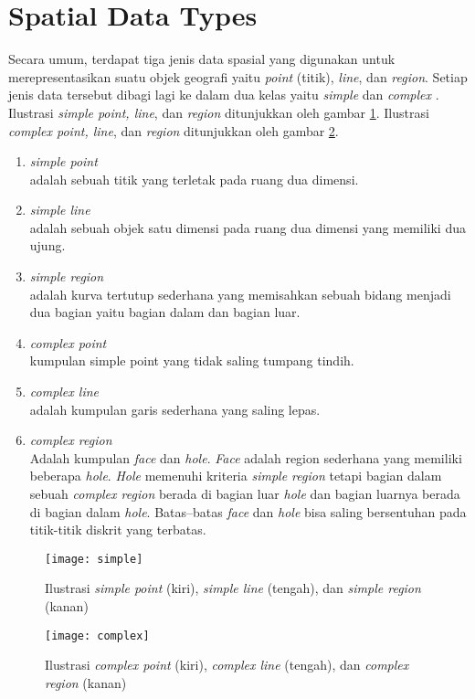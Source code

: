 \section{Spatial Data Types}
Secara umum, terdapat tiga jenis data spasial yang digunakan untuk merepresentasikan suatu objek geografi yaitu \textit{point} (titik), \textit{line}, dan \textit{region}. Setiap jenis data tersebut dibagi lagi ke dalam dua kelas yaitu \textit{simple} dan \textit{complex} \cite{advdb:15}. Ilustrasi \textit{simple point, line}, dan \textit{region} ditunjukkan oleh gambar \ref{fig:simple}. Ilustrasi \textit{complex point, line}, dan \textit{region} ditunjukkan oleh gambar \ref{fig:complex}.
\begin{enumerate}
\item \textit{simple point}\\
adalah sebuah titik yang terletak pada ruang dua dimensi.

\item \textit{simple line}\\
adalah sebuah objek satu dimensi pada ruang dua dimensi yang memiliki dua ujung.

\item \textit{simple region}\\
adalah kurva tertutup sederhana yang memisahkan sebuah bidang menjadi dua bagian yaitu bagian dalam dan bagian luar.

\item \textit{complex point}\\
kumpulan simple point yang tidak saling tumpang tindih.

\item \textit{complex line}\\
adalah kumpulan garis sederhana yang saling lepas.

\item \textit{complex region}\\
Adalah kumpulan \textit{face} dan  \textit{hole}. \textit{Face} adalah region sederhana yang memiliki beberapa \textit{hole}. \textit{Hole} memenuhi kriteria \textit{simple region} tetapi bagian dalam sebuah \textit{complex region} berada di bagian luar \textit{hole} dan bagian luarnya berada di bagian dalam \textit{hole}. Batas–batas \textit{face} dan \textit{hole} bisa saling bersentuhan pada titik-titik diskrit yang terbatas.

\end{enumerate}

\begin{figure}[H]
\centering  
	\texttt{[image: simple]}  
	\caption{Ilustrasi \textit{simple point} (kiri), \textit{simple line} (tengah), dan \textit{simple region} (kanan)} 
	\label{fig:simple} 
\end{figure}

\begin{figure}[H]
\centering  
	\texttt{[image: complex]}  
	\caption{Ilustrasi \textit{complex point} (kiri), \textit{complex line} (tengah), dan \textit{complex region} (kanan)} 
	\label{fig:complex} 
\end{figure}